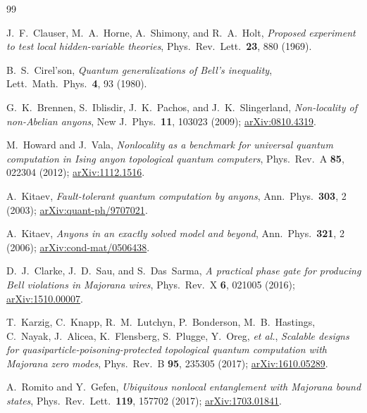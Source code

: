\documentclass[aps,pra,twocolumn,superscriptaddress,floatfix,nofootinbib]{revtex4-2}
\begin{document}
\begin{thebibliography}{99}

J.~F.~Clauser, M.~A.~Horne, A.~Shimony, and R.~A.~Holt,
\emph{Proposed experiment to test local hidden-variable theories},
Phys.\ Rev.\ Lett.\ \textbf{23}, 880 (1969).

B.~S.~Cirel'son,
\emph{Quantum generalizations of Bell's inequality},
Lett.\ Math.\ Phys.\ \textbf{4}, 93 (1980).

G.~K.~Brennen, S.~Iblisdir, J.~K.~Pachos, and J.~K.~Slingerland,
\emph{Non-locality of non-Abelian anyons},
New J.\ Phys.\ \textbf{11}, 103023 (2009);
\href{https://arxiv.org/abs/0810.4319}{arXiv:0810.4319}.

M.~Howard and J.~Vala,
\emph{Nonlocality as a benchmark for universal quantum computation in
Ising anyon topological quantum computers},
Phys.\ Rev.\ A \textbf{85}, 022304 (2012);
\href{https://arxiv.org/abs/1112.1516}{arXiv:1112.1516}.

A.~Kitaev,
\emph{Fault-tolerant quantum computation by anyons},
Ann.\ Phys.\ \textbf{303}, 2 (2003);
\href{https://arxiv.org/abs/quant-ph/9707021}{arXiv:quant-ph/9707021}.

A.~Kitaev,
\emph{Anyons in an exactly solved model and beyond},
Ann.\ Phys.\ \textbf{321}, 2 (2006);
\href{https://arxiv.org/abs/cond-mat/0506438}{arXiv:cond-mat/0506438}.

D.~J.~Clarke, J.~D.~Sau, and S.~Das~Sarma,
\emph{A practical phase gate for producing Bell violations in Majorana wires},
Phys.\ Rev.\ X \textbf{6}, 021005 (2016);
\href{https://arxiv.org/abs/1510.00007}{arXiv:1510.00007}.

T.~Karzig, C.~Knapp, R.~M.~Lutchyn, P.~Bonderson, M.~B.~Hastings,
C.~Nayak, J.~Alicea, K.~Flensberg, S.~Plugge, Y.~Oreg, \emph{et al.},
\emph{Scalable designs for quasiparticle-poisoning-protected
topological quantum computation with Majorana zero modes},
Phys.\ Rev.\ B \textbf{95}, 235305 (2017);
\href{https://arxiv.org/abs/1610.05289}{arXiv:1610.05289}.

A.~Romito and Y.~Gefen,
\emph{Ubiquitous nonlocal entanglement with Majorana bound states},
Phys.\ Rev.\ Lett.\ \textbf{119}, 157702 (2017);
\href{https://arxiv.org/abs/1703.01841}{arXiv:1703.01841}.


\end{thebibliography}
\end{document}
